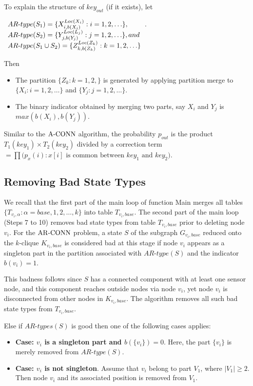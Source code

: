To explain the structure of $key_{out}$ (if it exists), let\\
\nwline
\begin{center}
$\begin{array}[t]{l}
AR\mbox{-}type(S_1)=\{X_{i,b(X_i)}^{Loc(X_i)} : i=1,2, \ldots\},\\
AR\mbox{-}type(S_2)=\{Y_{j,b(Y_j)}^{Loc(L_j)} : j=1,2, \ldots\}, and\\
AR\mbox{-}type(S_1\cup S_2)=\{Z_{k,b(Z_k)}^{Loc(Z_k)} : k=1,2, \ldots\}\end{array}$.
\end{center}
Then 
\begin{itemize}[noitemsep]
\item The partition $\{Z_k:k=1,2,\}$ is generated by applying partition merge to $\{X_i:i=1,2,\ldots\}$ and $\{Y_j:j=1,2,\ldots\}$.
\item The binary indicator obtained by merging two parts, say $X_i$ and $Y_j$ is  $max(b(X_i),b(Y_j))$.
\end{itemize}
Similar to the ${\mathrm {A\mbox{-}CONN}}$ algorithm, the probability $p_{out}$ is the product $T_1(key_1) \times T_2(key_2)$ divided by a correction term  $=\prod \big (p_x(i):x[i] \mbox{ is common between } key_1 \mbox{ and } key_2\big)$.

%

\subsection{Removing Bad State Types}
\label{subsec:rbst}
We recall that the first part of the main loop of function Main merges all tables $\{T_{v_i,\alpha} :\alpha=base,1,2, \ldots,k\}$ into table $T_{v_i,base}$. The second part of the main loop (Steps 7 to 10) removes bad state types from table $T_{v_i,base}$ prior to deleting node $v_i$.
%
For the ${\mathrm {AR\mbox{-}CONN}}$ problem, a state $S$ of the subgraph $G_{v_i,base}$ reduced onto the $k$-clique $K_{v_i,base}$ is considered bad at this stage if node $v_i$ appears as a singleton part in the partition associated with $AR\mbox{-}type(S)$ and the indicator $b({v_i})=1$.


 This badness follows since $S$ has a connected component with at least one sensor node, and this component reaches outside nodes via node $v_i$, yet node $v_i$ is disconnected from other nodes in $K_{v_i,base}$. The algorithm removes all such bad state types from $T_{v_i,base}$.

Else if $AR\mbox{-}types(S)$ is good then one of the following cases applies:
\begin{itemize}[noitemsep]
\item \textbf{Case: $v_i$ is a singleton part and $b(\{v_i\})=0$}. Here, the part $\{v_i\}$ is merely removed from $AR\mbox{-}type(S)$.
\item \textbf{Case: $v_i$ is not singleton}. Assume that $v_i$ belong to part $V_1$, where $|V_1|\geq 2$. Then node $v_i$ and its associated position is removed from $V_1$.
\end{itemize}

